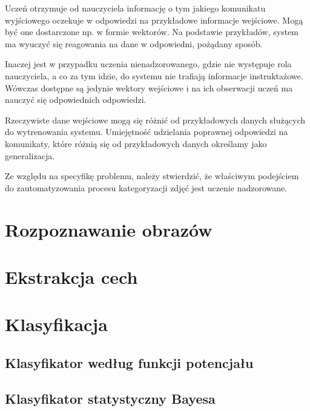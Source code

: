 Uczeń otrzymuje od nauczyciela informację o tym jakiego komunikatu wyjściowego oczekuje w odpowiedzi na przykładowe informacje wejściowe. Mogą być one dostarczone np. w formie wektorów. Na podstawie przykładów, system ma wyuczyć się reagowania na dane w odpowiedni, pożądany sposób.

Inaczej jest w przypadku uczenia nienadzorowanego, gdzie nie występuje rola nauczyciela, a co za tym idzie, do systemu nie trafiają informacje instruktażowe. Wówczas dostępne są jedynie wektory wejściowe i na ich obserwacji uczeń ma nauczyć się odpowiednich odpowiedzi.\cite{CICHOSZ00}

Rzeczywiste dane wejściowe mogą się różnić od przykładowych danych służących do wytrenowania systemu. Umiejętność udzielania poprawnej odpowiedzi na komunikaty, które różnią się od przykładowych danych określamy jako generalizacja.\cite{BISHOP06}

Ze względu na specyfikę problemu, należy stwierdzić, że właściwym podejściem do zautomatyzowania procesu kategoryzacji zdjęć jest uczenie nadzorowane.

\section{Rozpoznawanie obrazów}


\section{Ekstrakcja cech}

\section{Klasyfikacja}


\subsection{Klasyfikator według funkcji potencjału}

	
\subsection{Klasyfikator statystyczny Bayesa}

